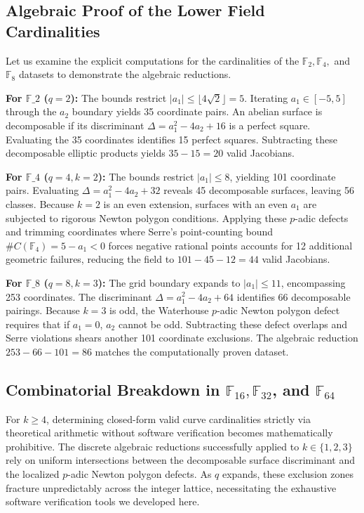 \documentclass[letterpaper, 11pt]{article}
\begin{document}
\subsection{Algebraic Proof of the Lower Field Cardinalities}
Let us examine the explicit computations for the cardinalities of the $\mathbb{F}_2, \mathbb{F}_4,$ and $\mathbb{F}_8$ datasets to demonstrate the algebraic reductions.

\textbf{For $\mathbb{F}\_2$ ($q=2$):}
The bounds restrict $\vert{}a_1\vert{} \le \lfloor 4\sqrt{2} \rfloor = 5$. Iterating $a_1 \in [-5, 5]$ through the $a_2$ boundary yields 35 coordinate pairs. An abelian surface is decomposable if its discriminant $\Delta = a_1^2 - 4a_2 + 16$ is a perfect square. Evaluating the 35 coordinates identifies 15 perfect squares. Subtracting these decomposable elliptic products yields $35 - 15 = 20$ valid Jacobians.

\textbf{For $\mathbb{F}\_4$ ($q=4, k=2$):}
The bounds restrict $\vert{}a_1\vert{} \le 8$, yielding 101 coordinate pairs. Evaluating $\Delta = a_1^2 - 4a_2 + 32$ reveals 45 decomposable surfaces, leaving 56 classes. Because $k=2$ is an even extension, surfaces with an even $a_1$ are subjected to rigorous Newton polygon conditions. Applying these $p$-adic defects and trimming coordinates where Serre's point-counting bound $\#C(\mathbb{F}_4) = 5 - a_1 < 0$ forces negative rational points accounts for 12 additional geometric failures, reducing the field to $101 - 45 - 12 = 44$ valid Jacobians.

\textbf{For $\mathbb{F}\_8$ ($q=8, k=3$):}
The grid boundary expands to $\vert{}a_1\vert{} \le 11$, encompassing 253 coordinates. The discriminant $\Delta = a_1^2 - 4a_2 + 64$ identifies 66 decomposable pairings. Because $k=3$ is odd, the Waterhouse $p$-adic Newton polygon defect requires that if $a_1 = 0$, $a_2$ cannot be odd. Subtracting these defect overlaps and Serre violations shears another 101 coordinate exclusions. The algebraic reduction $253 - 66 - 101 = 86$ matches the computationally proven dataset.

\subsection{Combinatorial Breakdown in \texorpdfstring{$\mathbb{F}_{16}, \mathbb{F}_{32}$}{F\_16, F\_32}, and \texorpdfstring{$\mathbb{F}_{64}$}{F\_64}}
For $k \ge 4$, determining closed-form valid curve cardinalities strictly via theoretical arithmetic without software verification becomes mathematically prohibitive. The discrete algebraic reductions successfully applied to $k \in \{1, 2, 3\}$ rely on uniform intersections between the decomposable surface discriminant and the localized $p$-adic Newton polygon defects. As $q$ expands, these exclusion zones fracture unpredictably across the integer lattice, necessitating the exhaustive software verification tools we developed here.
\end{document}
